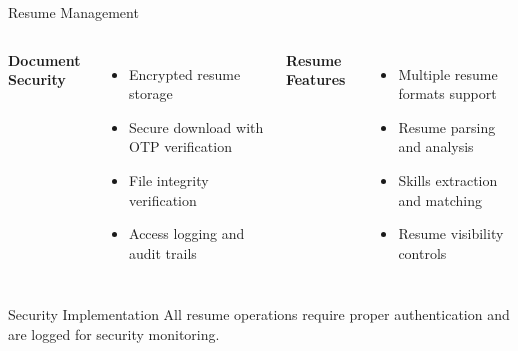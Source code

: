 \documentclass[aspectratio=169]{beamer}
\begin{document}
\begin{frame}{Resume Management}
\begin{columns}
\textbf{Document Security}
\begin{itemize}
    \item Encrypted resume storage
    \item Secure download with OTP verification
    \item File integrity verification
    \item Access logging and audit trails
\end{itemize}

\textbf{Resume Features}
\begin{itemize}
    \item Multiple resume formats support
    \item Resume parsing and analysis
    \item Skills extraction and matching
    \item Resume visibility controls
\end{itemize}
\end{columns}

\vspace{0.3cm}
\begin{alertblock}{Security Implementation}
All resume operations require proper authentication and are logged for security monitoring.
\end{alertblock}
\end{frame}
\end{document}
